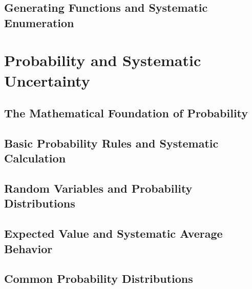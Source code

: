 \documentclass[12pt, oneside, openany]{book}
\let\oldchapter\chapter
\renewcommand{\chapter}{
	\cleardoublepage
	\thispagestyle{chapter}
	\oldchapter
}
\begin{document}
\section{Generating Functions and Systematic Enumeration}


\chapter{Probability and Systematic Uncertainty}

\section{The Mathematical Foundation of Probability}

\section{Basic Probability Rules and Systematic Calculation}

\section{Random Variables and Probability Distributions}

\section{Expected Value and Systematic Average Behavior}

\section{Common Probability Distributions}
\end{document}
